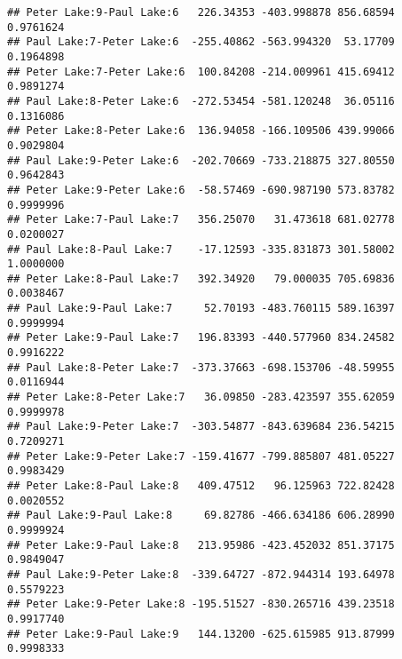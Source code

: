 \documentclass[]{article}
\newenvironment{Shaded}{\begin{snugshade}}{\end{snugshade}}
\newcommand{\CommentTok}[1]{\textcolor[rgb]{0.56,0.35,0.01}{\textit{#1}}}
\newcommand{\DataTypeTok}[1]{\textcolor[rgb]{0.13,0.29,0.53}{#1}}
\newcommand{\FloatTok}[1]{\textcolor[rgb]{0.00,0.00,0.81}{#1}}
\newcommand{\KeywordTok}[1]{\textcolor[rgb]{0.13,0.29,0.53}{\textbf{#1}}}
\newcommand{\NormalTok}[1]{#1}
\newcommand{\OperatorTok}[1]{\textcolor[rgb]{0.81,0.36,0.00}{\textbf{#1}}}
\newcommand{\StringTok}[1]{\textcolor[rgb]{0.31,0.60,0.02}{#1}}
\begin{document}
\begin{verbatim}
## Peter Lake:9-Paul Lake:6   226.34353 -403.998878 856.68594 0.9761624
## Paul Lake:7-Peter Lake:6  -255.40862 -563.994320  53.17709 0.1964898
## Peter Lake:7-Peter Lake:6  100.84208 -214.009961 415.69412 0.9891274
## Paul Lake:8-Peter Lake:6  -272.53454 -581.120248  36.05116 0.1316086
## Peter Lake:8-Peter Lake:6  136.94058 -166.109506 439.99066 0.9029804
## Paul Lake:9-Peter Lake:6  -202.70669 -733.218875 327.80550 0.9642843
## Peter Lake:9-Peter Lake:6  -58.57469 -690.987190 573.83782 0.9999996
## Peter Lake:7-Paul Lake:7   356.25070   31.473618 681.02778 0.0200027
## Paul Lake:8-Paul Lake:7    -17.12593 -335.831873 301.58002 1.0000000
## Peter Lake:8-Paul Lake:7   392.34920   79.000035 705.69836 0.0038467
## Paul Lake:9-Paul Lake:7     52.70193 -483.760115 589.16397 0.9999994
## Peter Lake:9-Paul Lake:7   196.83393 -440.577960 834.24582 0.9916222
## Paul Lake:8-Peter Lake:7  -373.37663 -698.153706 -48.59955 0.0116944
## Peter Lake:8-Peter Lake:7   36.09850 -283.423597 355.62059 0.9999978
## Paul Lake:9-Peter Lake:7  -303.54877 -843.639684 236.54215 0.7209271
## Peter Lake:9-Peter Lake:7 -159.41677 -799.885807 481.05227 0.9983429
## Peter Lake:8-Paul Lake:8   409.47512   96.125963 722.82428 0.0020552
## Paul Lake:9-Paul Lake:8     69.82786 -466.634186 606.28990 0.9999924
## Peter Lake:9-Paul Lake:8   213.95986 -423.452032 851.37175 0.9849047
## Paul Lake:9-Peter Lake:8  -339.64727 -872.944314 193.64978 0.5579223
## Peter Lake:9-Peter Lake:8 -195.51527 -830.265716 439.23518 0.9917740
## Peter Lake:9-Paul Lake:9   144.13200 -625.615985 913.87999 0.9998333
\end{verbatim}

\begin{Shaded}
\end{Shaded}
\end{document}
